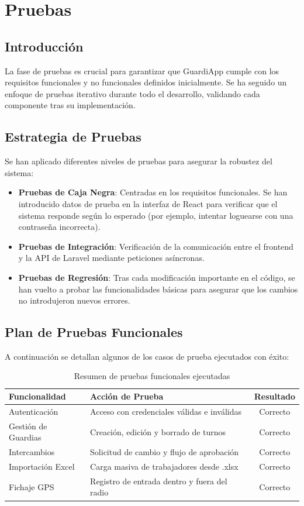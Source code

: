 \chapter{Pruebas} \label{cap:pruebas}

\section{Introducción}
La fase de pruebas es crucial para garantizar que GuardiApp cumple con los requisitos funcionales y no funcionales definidos inicialmente. Se ha seguido un enfoque de pruebas iterativo durante todo el desarrollo, validando cada componente tras su implementación.

\section{Estrategia de Pruebas}
Se han aplicado diferentes niveles de pruebas para asegurar la robustez del sistema:

\begin{itemize}
    \item \textbf{Pruebas de Caja Negra}: Centradas en los requisitos funcionales. Se han introducido datos de prueba en la interfaz de React para verificar que el sistema responde según lo esperado (por ejemplo, intentar loguearse con una contraseña incorrecta).
    \item \textbf{Pruebas de Integración}: Verificación de la comunicación entre el frontend y la API de Laravel mediante peticiones asíncronas.
    \item \textbf{Pruebas de Regresión}: Tras cada modificación importante en el código, se han vuelto a probar las funcionalidades básicas para asegurar que los cambios no introdujeron nuevos errores.
\end{itemize}

\section{Plan de Pruebas Funcionales}
A continuación se detallan algunos de los casos de prueba ejecutados con éxito:

\begin{table}[H]
\centering
\caption{Resumen de pruebas funcionales ejecutadas}
\begin{tabular}{|l|l|c|}
\hline
\textbf{Funcionalidad} & \textbf{Acción de Prueba} & \textbf{Resultado} \\ \hline
Autenticación & Acceso con credenciales válidas e inválidas & Correcto \\ \hline
Gestión de Guardias & Creación, edición y borrado de turnos & Correcto \\ \hline
Intercambios & Solicitud de cambio y flujo de aprobación & Correcto \\ \hline
Importación Excel & Carga masiva de trabajadores desde .xlsx & Correcto \\ \hline
Fichaje GPS & Registro de entrada dentro y fuera del radio & Correcto \\ \hline
\end{tabular}
\end{table}

